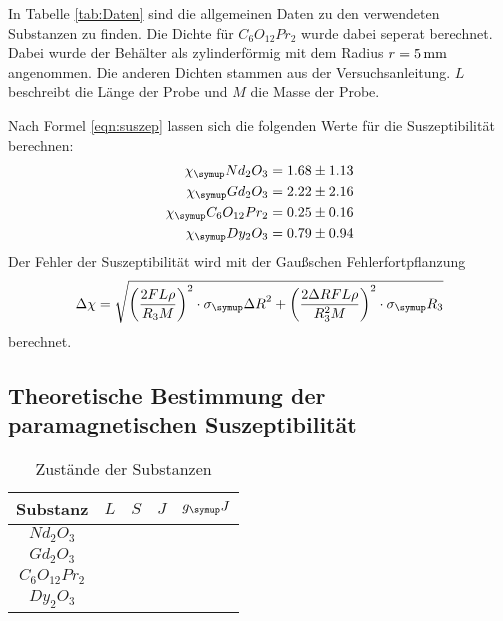 In Tabelle \ref{tab:Daten} sind die allgemeinen Daten zu den verwendeten Substanzen
zu finden. Die Dichte für $C_6O_{12}Pr_2$ wurde dabei seperat berechnet. Dabei wurde
der Behälter als zylinderförmig mit dem Radius $r=5\,\si{\milli\meter}$ angenommen. Die anderen Dichten
stammen aus der Versuchsanleitung. $L$ beschreibt die Länge der Probe und $M$ die
Masse der Probe.

Nach Formel \eqref{eqn:suszep} lassen sich die folgenden Werte für die Suszeptibilität
berechnen:
\begin{align*}
  \chi_\su{Nd_2O_3}       &= 1.68 \pm 1.13 \\
  \chi_\su{Gd_2O_3}       &= 2.22 \pm 2.16 \\
  \chi_\su{C_6O_{12}Pr_2} &= 0.25 \pm 0.16 \\
  \chi_\su{Dy_2O_3}       &= 0.79 \pm 0.94 %
\end{align*}
Der Fehler der Suszeptibilität wird mit der Gaußschen Fehlerfortpflanzung
\begin{equation*}
  \Delta\chi = \sqrt{\left(\frac{2FL\rho}{R_3M}\right)^2\cdot\sigma_\su{\Delta R}^2
  + \left(\frac{2\Delta R FL\rho}{R_3^2M}\right)^2\cdot\sigma_\su{R_3}}
\end{equation*}
berechnet.

\subsection{Theoretische Bestimmung der paramagnetischen Suszeptibilität}

\begin{table}
  \centering
  \begin{tabular}{c c c c c}
    \toprule
    Substanz & $L$ & $S$ & $J$ & $g_\su{J}$ \\
    \midrule
    $Nd_2O_3$  &  & &  &  \\
    $Gd_2O_3$   &  & & & \\
    $C_6O_{12}Pr_2$ & & & & \\
    $Dy_2O_3$ &  & &  & \\
    \bottomrule
  \end{tabular}
  \caption{Zustände der Substanzen}
  \label{tab:zustände}
\end{table}
